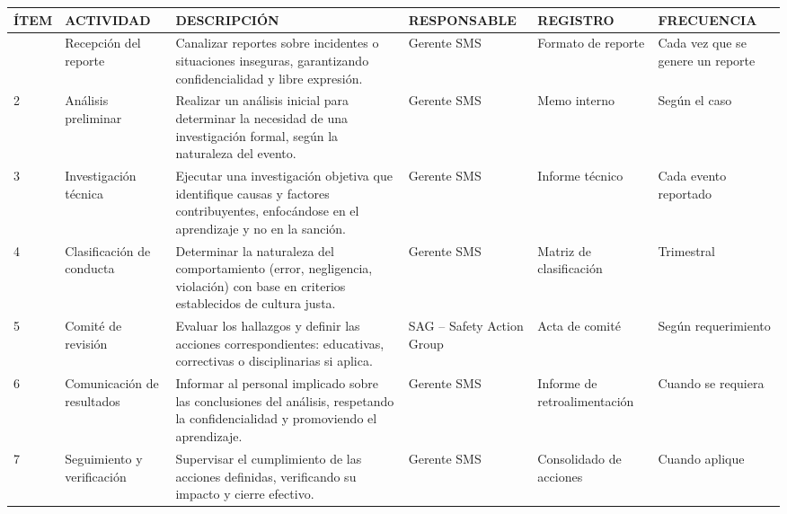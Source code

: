 \begin{table}[H]
\begin{adjustbox}{center}
\centering
\footnotesize
\begin{tabular}{|>{\centering\arraybackslash}m{1.0cm}|>{\centering\arraybackslash}m{2.4cm}|>{\RaggedRight\arraybackslash}m{4.8cm}|>{\centering\arraybackslash}m{2.5cm}|>{\centering\arraybackslash}m{1.9cm}|>{\centering\arraybackslash}m{2.2cm}|}
\hline
\rowcolor{gray!20}
\textbf{ÍTEM} & \textbf{ACTIVIDAD} & \textbf{DESCRIPCIÓN} & \textbf{RESPONSABLE} & \textbf{REGISTRO} & \textbf{FRECUENCIA} \\
\hline
 
1 &
Recepción del reporte &
Canalizar reportes sobre incidentes o situaciones inseguras, garantizando confidencialidad y libre expresión. &
Gerente SMS &
Formato de reporte &
Cada vez que se genere un reporte \\
\hline
 
2 &
Análisis preliminar &
Realizar un análisis inicial para determinar la necesidad de una investigación formal, según la naturaleza del evento. &
Gerente SMS &
Memo interno &
Según el caso \\
\hline
 
3 &
Investigación técnica &
Ejecutar una investigación objetiva que identifique causas y factores contribuyentes, enfocándose en el aprendizaje y no en la sanción. &
Gerente SMS &
Informe técnico &
Cada evento reportado \\
\hline
 
4 &
Clasificación de conducta &
Determinar la naturaleza del comportamiento (error, negligencia, violación) con base en criterios establecidos de cultura justa. &
Gerente SMS &
Matriz de clasificación &
Trimestral \\
\hline
 
5 &
Comité de revisión &
Evaluar los hallazgos y definir las acciones correspondientes: educativas, correctivas o disciplinarias si aplica. &
SAG -- Safety Action Group &
Acta de comité &
Según requerimiento \\
\hline
 
6 &
Comunicación de resultados &
Informar al personal implicado sobre las conclusiones del análisis, respetando la confidencialidad y promoviendo el aprendizaje. &
Gerente SMS &
Informe de retroalimentación &
Cuando se requiera \\
\hline
 
7 &
Seguimiento y verificación &
Supervisar el cumplimiento de las acciones definidas, verificando su impacto y cierre efectivo. &
Gerente SMS &
Consolidado de acciones &
Cuando aplique \\
\hline
 

\end{tabular}
\end{adjustbox}
\end{table}
